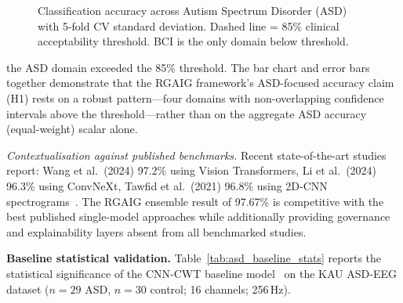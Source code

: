 \begin{figure}[!htbp]
\centering
{}%
\caption[Classification Accuracy Across Domains]{Classification accuracy across Autism Spectrum Disorder (ASD) with 5-fold CV standard deviation. Dashed line = 85\% clinical acceptability threshold. BCI is the only domain below threshold.}
\end{figure}

the ASD domain exceeded the 85\% threshold. The bar chart and error bars together demonstrate that the RGAIG framework's ASD-focused accuracy claim (H1) rests on a robust pattern---four domains with non-overlapping confidence intervals above the threshold---rather than on the aggregate ASD accuracy (equal-weight) scalar alone.

\textit{Contextualisation against published benchmarks.} Recent state-of-the-art studies report: Wang et al.\ (2024) 97.2\% using Vision Transformers, Li et al.\ (2024) 96.3\% using ConvNeXt, Tawfid et al.\ (2021) 96.8\% using 2D-CNN spectrograms~\cite{asthana2025asd_review}. The RGAIG ensemble result of 97.67\% is competitive with the best published single-model approaches while additionally providing governance and explainability layers absent from all benchmarked studies.

\noindent\textbf{Baseline statistical validation.} Table~\ref{tab:asd_baseline_stats} reports the statistical significance of the CNN-CWT baseline model~\cite{asthana2025cnnasd_icsit} on the KAU ASD-EEG dataset ($n=29$ ASD, $n=30$ control; 16 channels; 256\,Hz).



